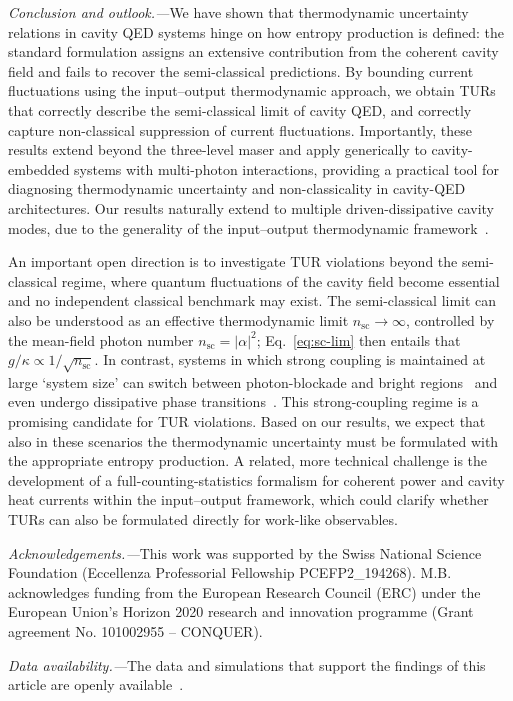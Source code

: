 \documentclass[aps,twocolumn,10pt,prl,floatfix,nofootinbib, superscriptaddress]{revtex4-2}
\begin{document}
\textit{Conclusion and outlook.---}We have shown that thermodynamic uncertainty relations in cavity QED systems hinge on how entropy production is defined: the standard formulation assigns an extensive contribution from the coherent cavity field and fails to recover the semi-classical predictions. By bounding current fluctuations using the input–output thermodynamic approach, we obtain TURs that correctly describe the semi-classical limit of cavity QED, and correctly capture non-classical suppression of current fluctuations. Importantly, these results extend beyond the three-level maser and apply generically to cavity-embedded systems with multi-photon interactions, providing a practical tool for diagnosing thermodynamic uncertainty and non-classicality in cavity-QED architectures. Our results naturally extend to multiple driven-dissipative cavity modes, due to the generality of the input--output thermodynamic framework~\cite{schrauwen2025}.


An important open direction is to investigate TUR violations beyond the semi-classical regime, where quantum fluctuations of the cavity field become essential and no independent classical benchmark may exist.
The semi-classical limit can also be understood as an effective thermodynamic limit $n_\text{sc}\to \infty$,  controlled by the mean-field photon number $n_\text{sc} = |\alpha|^2$; Eq.~\eqref{eq:sc-lim} then entails that $g/\kappa \propto 1/\sqrt{n_\text{sc}}$. In contrast, systems in which  strong coupling is maintained at large `system size' can switch between photon-blockade and bright regions~\cite{Imamoglu1997, Rebic2009, Carmichael2016, Roberts2020, Daniel2026} and even undergo dissipative phase transitions~\cite{Mercurio2026}. This strong-coupling regime is a promising candidate for TUR violations. Based on our results, we expect that also in these scenarios the thermodynamic uncertainty must be formulated with the appropriate entropy production.
A related, more technical challenge is the development of a full-counting-statistics formalism for coherent power and cavity heat currents within the input--output framework, which could clarify whether TURs can also be formulated directly for work-like observables.



\begin{acknowledgments}
\textit{Acknowledgements.—}This work was supported by the Swiss National Science Foundation (Eccellenza Professorial Fellowship PCEFP2\_194268).
M.B. acknowledges funding from the European Research Council (ERC) under the European Union’s Horizon 2020 research and innovation programme (Grant agreement No. 101002955 – CONQUER).

\textit{Data availability.—}The data and simulations that support the findings of this article are openly available~\cite{Janovitch_QuTLM_numerics_2026}.
\end{acknowledgments}
\end{document}
